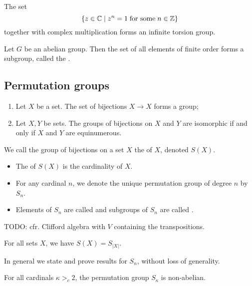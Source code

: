 \begin{example}
The set
\[ \left\{ z\in \mathbb{C} \;\middle|\; z^n = 1\;\text{for some}\; n\in \mathbb{Z} \right\} \]
together with complex multiplication forms an infinite torsion group.
\end{example}

\begin{lemma}
Let $G$ be an abelian group. Then the set of all elements of finite order forms a subgroup, called the .
\end{lemma}


\subsection{Permutation groups}
\begin{proposition} \mbox{}
\begin{enumerate}
\item Let $X$ be a set. The set of bijections $X\to X$ forms a group;
\item Let $X,Y$ be sets. The groups of bijections on $X$ and $Y$ are isomorphic \textup{if and only if} $X$ and $Y$ are equinumerous.
\end{enumerate}
\end{proposition}

\begin{definition}
We call the group of bijections on a set $X$ the  of $X$, denoted $S(X)$.
\begin{itemize}
\item The  of $S(X)$ is the cardinality of $X$.
\item For any cardinal $n$, we denote the unique permutation group of degree $n$ by $S_n$.
\item Elements of $S_n$ are called  and subgroups of $S_n$ are called .
\end{itemize}
\end{definition}

TODO: cfr. Clifford algebra with $V$ containing the transpositions.

\begin{proposition}
For all sets $X$, we have $S(X) = S_{|X|}$.
\end{proposition}
In general we state and prove results for $S_n$, without loss of generality.

\begin{lemma}
For all cardinals $\kappa >_c 2$, the permutation group $S_\kappa$ is non-abelian.
\end{lemma}

